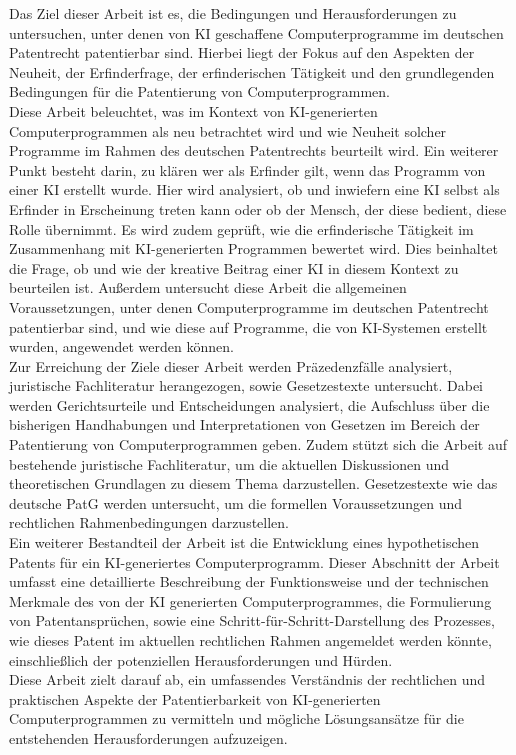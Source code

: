 Das Ziel dieser Arbeit ist es, 
die Bedingungen und Herausforderungen zu untersuchen,
unter denen von KI geschaffene Computerprogramme im deutschen Patentrecht 
patentierbar sind. Hierbei liegt der Fokus auf den Aspekten der Neuheit, 
der Erfinderfrage, der erfinderischen Tätigkeit 
und den grundlegenden Bedingungen für die Patentierung von Computerprogrammen. 
\\

Diese Arbeit beleuchtet, 
was im Kontext von KI-generierten Computerprogrammen 
als neu betrachtet wird 
und wie Neuheit solcher Programme 
im Rahmen des deutschen Patentrechts beurteilt wird. 
Ein weiterer Punkt besteht darin, zu klären 
wer als Erfinder gilt,
wenn das Programm von einer KI erstellt wurde. 
Hier wird analysiert, 
ob und inwiefern eine KI selbst als Erfinder in Erscheinung treten kann 
oder ob der Mensch, der diese bedient, 
diese Rolle übernimmt. 
Es wird zudem geprüft, 
wie die erfinderische Tätigkeit im Zusammenhang 
mit KI-generierten Programmen bewertet wird. 
Dies beinhaltet die Frage, 
ob und wie der kreative Beitrag einer KI in diesem Kontext zu beurteilen ist. 
Außerdem untersucht diese Arbeit die allgemeinen Voraussetzungen, 
unter denen Computerprogramme im deutschen Patentrecht patentierbar sind, 
und wie diese auf Programme, 
die von KI-Systemen erstellt wurden, angewendet werden können. 
\\

Zur Erreichung der Ziele dieser Arbeit werden Präzedenzfälle analysiert, 
juristische Fachliteratur herangezogen, sowie Gesetzestexte untersucht. 
Dabei werden Gerichtsurteile und Entscheidungen analysiert, 
die Aufschluss über die bisherigen Handhabungen 
und Interpretationen 
von Gesetzen im Bereich der Patentierung von Computerprogrammen geben. 
Zudem stützt sich die Arbeit auf bestehende juristische Fachliteratur, 
um die aktuellen Diskussionen 
und theoretischen Grundlagen zu diesem Thema darzustellen.
Gesetzestexte wie das deutsche PatG werden untersucht, 
um die formellen Voraussetzungen und rechtlichen Rahmenbedingungen darzustellen. 
\\
Ein weiterer Bestandteil der Arbeit ist die Entwicklung eines hypothetischen Patents 
für ein KI-generiertes Computerprogramm. 
Dieser Abschnitt der Arbeit umfasst eine detaillierte Beschreibung der Funktionsweise 
und der technischen Merkmale des von der KI generierten Computerprogrammes, 
die Formulierung von Patentansprüchen, 
sowie eine Schritt-für-Schritt-Darstellung des Prozesses, 
wie dieses Patent im aktuellen rechtlichen Rahmen angemeldet werden könnte, 
einschließlich der potenziellen Herausforderungen und Hürden. 
\\
Diese Arbeit zielt darauf ab, 
ein umfassendes Verständnis der rechtlichen 
und praktischen Aspekte der 
Patentierbarkeit von KI-generierten Computerprogrammen zu vermitteln 
und mögliche Lösungsansätze für die entstehenden
Herausforderungen aufzuzeigen. 


